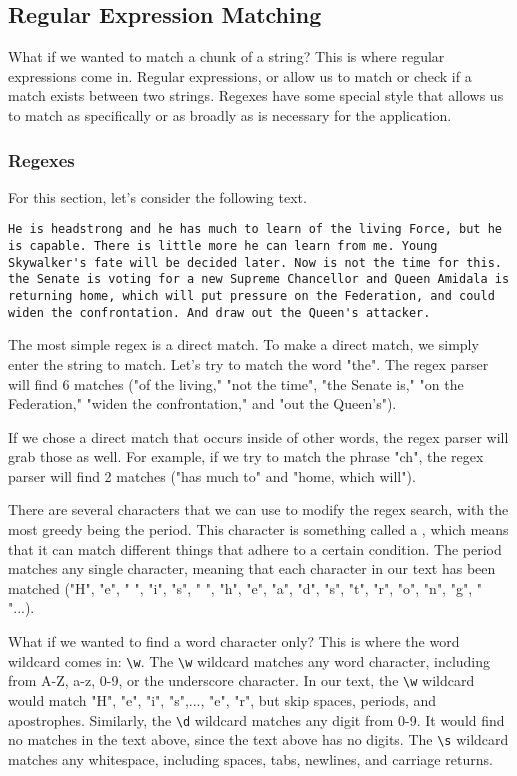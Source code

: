 \subsection{Regular Expression Matching}
What if we wanted to match a chunk of a string? This is where regular expressions come in. Regular expressions, or  allow us to match or check if a match exists between two strings. Regexes have some special style that allows us to match as specifically or as broadly as is necessary for the application.\par
\subsubsection{Regexes}
For this section, let's consider the following text.
\begin{lstlisting}[style=none]
He is headstrong and he has much to learn of the living Force, but he is capable. There is little more he can learn from me. Young Skywalker's fate will be decided later. Now is not the time for this. the Senate is voting for a new Supreme Chancellor and Queen Amidala is returning home, which will put pressure on the Federation, and could widen the confrontation. And draw out the Queen's attacker.
\end{lstlisting}
The most simple regex is a direct match. To make a direct match, we simply enter the string to match. Let's try to match the word "the". The regex parser will find 6 matches ("of the living," "not the time", "the Senate is," "on the Federation," "widen the confrontation," and "out the Queen's").\par
If we chose a direct match that occurs inside of other words, the regex parser will grab those as well. For example, if we try to match the phrase "ch", the regex parser will find 2 matches ("has much to" and "home, which will").\par
There are several characters that we can use to modify the regex search, with the most greedy being the period. This character is something called a , which means that it can match different things that adhere to a certain condition. The period matches any single character, meaning that each character in our text has been matched ("H", "e", " ", "i", "s", " ", "h", "e", "a", "d", "s", "t", "r", "o", "n", "g", " "...).\par
What if we wanted to find a word character only? This is where the word wildcard comes in: \verb|\w|. The \verb|\w| wildcard matches any word character, including from A-Z, a-z, 0-9, or the underscore character. In our text, the \verb|\w| wildcard would match "H", "e", "i", "s",..., "e", "r", but skip spaces, periods, and apostrophes. Similarly, the \verb|\d| wildcard matches any digit from 0-9. It would find no matches in the text above, since the text above has no digits. The \verb|\s| wildcard matches any whitespace, including spaces, tabs, newlines, and carriage returns.\par
